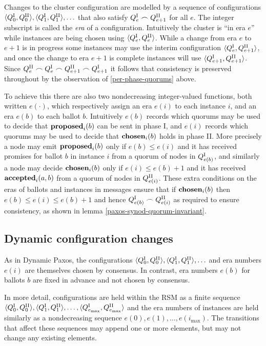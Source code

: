 \documentclass[journal]{IEEEtran}
\begin{document}
Changes to the cluster configuration are modelled by a sequence of
configurations $ \langle {Q}^\textrm{I}_{0}, {Q}^\textrm{II}_{0} \rangle, \langle {Q}^\textrm{I}_{1}, {Q}^\textrm{II}_{1}
\rangle, \ldots$ that also satisfy ${Q}^\textrm{I}_{e} \frown {Q}^\textrm{II}_{e+1}$ for all $e$.  The
integer subscript is called the \textit{era} of a configuration.  Intuitively
the cluster is ``in era $e$'' while instances are being chosen using $\langle
{Q}^\textrm{I}_{e}, {Q}^\textrm{II}_{e}\rangle$. While a change from era $e$ to $e+1$ is in progress
some instances may use the interim configuration $\langle {Q}^\textrm{I}_{e}, {Q}^\textrm{II}_{e+1}
\rangle$, and once the change to era $e+1$ is complete instances will use
$\langle {Q}^\textrm{I}_{e+1}, {Q}^\textrm{II}_{e+1} \rangle$. Since ${Q}^\textrm{II}_{e} \frown {Q}^\textrm{I}_{e} \frown
{Q}^\textrm{II}_{e+1} \frown {Q}^\textrm{I}_{e+1}$ it follows that consistency is preserved throughout
by the observation of \ref{per-phase-quorums} above.

To achieve this there are also two nondecreasing integer-valued functions, both
written $e(\cdot)$, which respectively assign an era $e(i)$ to each instance
$i$, and an era $e(b)$ to each ballot $b$. Intuitively $e(b)$ records which
quorums may be used to decide that $\mathbf{proposed}_{i}(b)$ can be sent in phase I, and
$e(i)$ records which quorums may be used to decide that $\mathbf{chosen}_{i}(b)$ holds
in phase II. More precisely a node may emit $\mathbf{proposed}_{i}(b)$ only if $e(b) \le
e(i)$ and it has received promises for ballot $b$ in instance $i$ from a quorum
of nodes in ${Q}^\textrm{I}_{e(b)}$, and similarly a node may decide $\mathbf{chosen}_{i}(b)$ only
if ${e(i) \le e(b)+1}$ and it has received $\mathbf{accepted}_{i}(a,b)$ from a quorum of
nodes in ${Q}^\textrm{II}_{e(i)}$. These extra conditions on the eras of ballots and
instances in messages ensure that if $\mathbf{chosen}_{i}(b)$ then ${e(b) \le e(i) \le
e(b)+1}$ and hence ${Q}^\textrm{I}_{e(b)} \frown {Q}^\textrm{II}_{e(i)}$ as required to ensure
consistency, as shown in lemma \ref{paxos-synod-quorum-invariant}.

\subsection{Dynamic configuration changes}

As in Dynamic Paxos, the configurations $\langle {Q}^\textrm{I}_{0}, {Q}^\textrm{II}_{0} \rangle,
\langle {Q}^\textrm{I}_{1}, {Q}^\textrm{II}_{1} \rangle, \ldots$ and era numbers $e(i)$ are themselves
chosen by consensus. In contrast, era numbers $e(b)$ for ballots $b$ are fixed
in advance and not chosen by consensus.

In more detail, configurations are held within the RSM as a finite sequence
$\langle {Q}^\textrm{I}_{0}, {Q}^\textrm{II}_{0} \rangle, \langle {Q}^\textrm{I}_{1}, {Q}^\textrm{II}_{1} \rangle, \ldots,
\langle {Q}^\textrm{I}_{e_\mathrm{max}}, {Q}^\textrm{II}_{e_\mathrm{max}} \rangle$ and the era numbers
of instances are held similarly as a nondecreasing sequence $e(0), e(1),
\ldots, e(i_\mathrm{max})$.  The transitions that affect these sequences may
append one or more elements, but may not change any existing elements.
\end{document}
